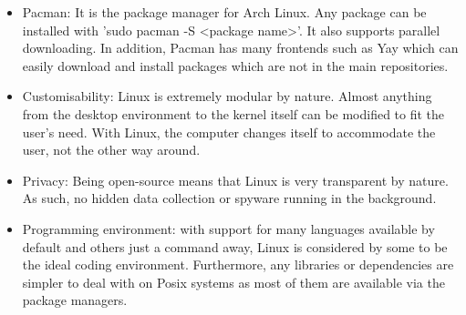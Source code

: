 \documentclass[12pt, a4paper]{article}
\begin{document}
\begin{itemize}
  \item Pacman: It is the package manager for Arch Linux. Any package can 
    be installed with 'sudo pacman -S <package name>'. It also supports 
    parallel downloading. In addition, Pacman has many frontends such 
    as Yay which can easily download and install packages which are
    not in the main repositories.
  \item Customisability: Linux is extremely modular by nature. Almost
    anything from the desktop environment to the kernel itself can
    be modified to fit the user's need. With Linux, the computer changes
    itself to accommodate the user, not the other way around.
  \item Privacy: Being open-source means that Linux is very transparent
    by nature. As such, no hidden data collection or spyware running in 
    the background.
  \item Programming environment: with support for many languages available
    by default and others just a command away, Linux is considered
    by some to be the ideal coding environment. Furthermore, any libraries
    or dependencies are simpler to deal with on Posix systems as most 
    of them are available via the package managers.
\end{itemize}

\end{document}
